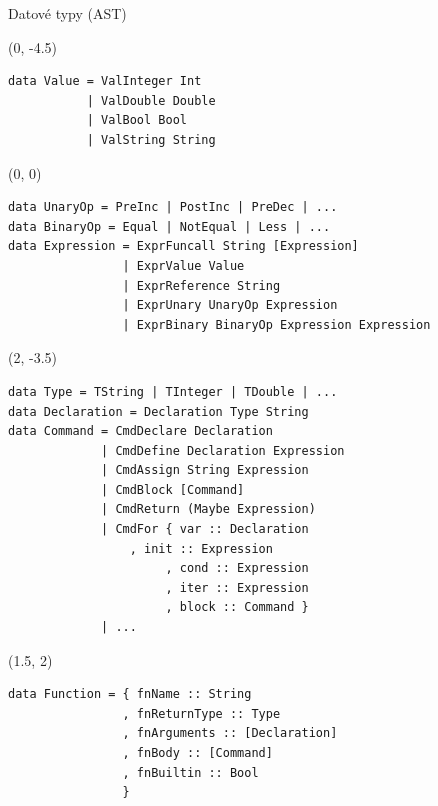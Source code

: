 \documentclass[13pt]{beamer}
\begin{document}
\begin{frame}[fragile]{Datové typy (AST)}


\TPMargin{5pt}

\begin{textblock}{10}(0, -4.5)
\begin{verbatim}
data Value = ValInteger Int
           | ValDouble Double
           | ValBool Bool
           | ValString String
\end{verbatim}
\end{textblock}

\pause
\begin{textblock}{16}(0, 0)
\begin{verbatim}
data UnaryOp = PreInc | PostInc | PreDec | ...
data BinaryOp = Equal | NotEqual | Less | ...
data Expression = ExprFuncall String [Expression]
                | ExprValue Value
                | ExprReference String
                | ExprUnary UnaryOp Expression
                | ExprBinary BinaryOp Expression Expression
\end{verbatim}
\end{textblock}

\pause
\begin{textblock}{14}(2, -3.5)
\begin{verbatim}
data Type = TString | TInteger | TDouble | ...
data Declaration = Declaration Type String
data Command = CmdDeclare Declaration
             | CmdDefine Declaration Expression
             | CmdAssign String Expression
             | CmdBlock [Command]
             | CmdReturn (Maybe Expression)
             | CmdFor { var :: Declaration
             	 , init :: Expression
                      , cond :: Expression
                      , iter :: Expression
                      , block :: Command }
             | ...
\end{verbatim}
\end{textblock}

\pause
\begin{textblock}{13.5}(1.5, 2)
\begin{verbatim}
data Function = { fnName :: String
                , fnReturnType :: Type
                , fnArguments :: [Declaration]
                , fnBody :: [Command]
                , fnBuiltin :: Bool
                }
\end{verbatim}
\end{textblock}

\end{frame}
\end{document}
